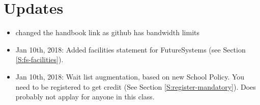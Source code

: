 
\chapter{Updates}

\begin{itemize}

\item changed the handbook link as github has bandwidth limits

\item Jan 10th, 2018: Added facilities statement for FutureSystems
  (see Section \ref{S:fs-facilities}).

\item Jan 10th, 2018:  Wait list augmentation, based on new School
  Policy. You need to be registered to get credit (See Section
  \ref{S:register-mandatory}). Does probably not applay for anyone in
  this class. 

\end{itemize}
